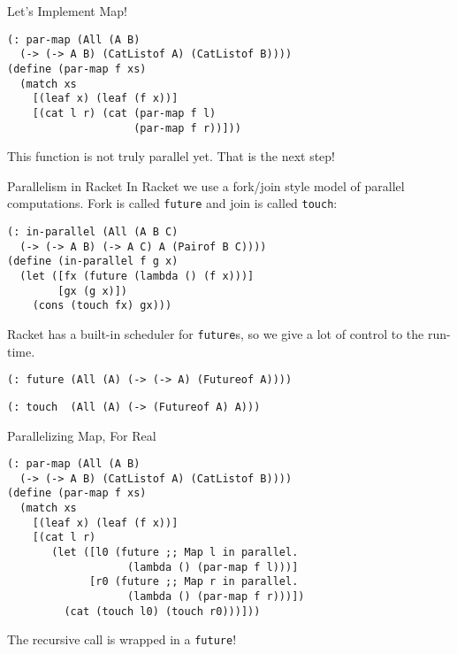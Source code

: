 \documentclass{beamer}
\begin{document}
\begin{frame}[fragile]{Let's Implement Map!}
\begin{lstlisting}
(: par-map (All (A B)
  (-> (-> A B) (CatListof A) (CatListof B))))
(define (par-map f xs)
  (match xs
    [(leaf x) (leaf (f x))]
    [(cat l r) (cat (par-map f l)
                    (par-map f r))]))
\end{lstlisting}

This function is not truly parallel yet. That is the next step!

\end{frame}

\begin{frame}[fragile]{Parallelism in Racket}
In Racket we use a fork/join style model of parallel computations. Fork is called \lstinline{future} and join is called \lstinline{touch}:

\begin{lstlisting}
(: in-parallel (All (A B C)
  (-> (-> A B) (-> A C) A (Pairof B C))))
(define (in-parallel f g x)
  (let ([fx (future (lambda () (f x)))]
        [gx (g x)])
    (cons (touch fx) gx)))
\end{lstlisting}

\pause{} \vspace{.5cm}

Racket has a built-in scheduler for \lstinline{future}s, so we give a lot of control to the run-time.

\lstinline{(: future (All (A) (-> (-> A) (Futureof A))))}

\lstinline{(: touch  (All (A) (-> (Futureof A) A)))}
\end{frame}

\begin{frame}[fragile]{Parallelizing Map, For Real}
\begin{lstlisting}
(: par-map (All (A B)
  (-> (-> A B) (CatListof A) (CatListof B))))
(define (par-map f xs)
  (match xs
    [(leaf x) (leaf (f x))]
    [(cat l r)
       (let ([l0 (future ;; Map l in parallel.
                   (lambda () (par-map f l)))]
             [r0 (future ;; Map r in parallel.
                   (lambda () (par-map f r)))])
         (cat (touch l0) (touch r0)))]))
\end{lstlisting}

The recursive call is wrapped in a \lstinline{future}!
\end{frame}
\end{document}

